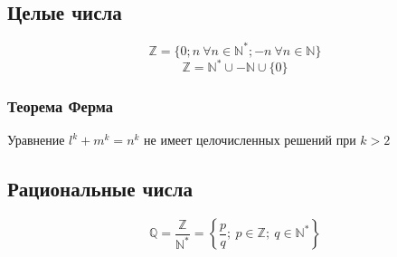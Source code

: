 \documentclass[class=article,a4paper,12pt,crop=false]{standalone}
\begin{document}
\subsection{Целые числа}

\begin{equation}
  \mathbb{Z} = \{0; n \: \forall n \in \mathbb{N}^*; -n \: \forall n \in \mathbb{N}\}
\end{equation}
\begin{equation}
  \mathbb{Z} = \mathbb{N}^* \cup -\mathbb{N} \cup \{0\}
\end{equation}

\subsubsection{Теорема Ферма}

Уравнение $l^k + m^k = n^k$ не имеет целочисленных решений при $k > 2$

\subsection{Рациональные числа}

\begin{equation}
  \mathbb{Q} = \frac{\mathbb{Z}}{\mathbb{N}^*} =
  \left\{\frac{p}{q}; \: p \in \mathbb{Z}; \: q \in \mathbb{N}^* \right\}
\end{equation}
\end{document}

